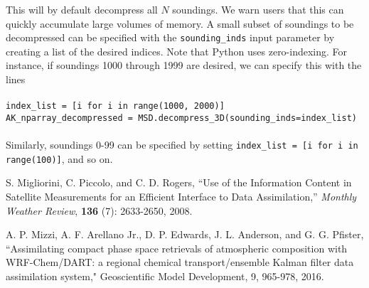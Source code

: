 \documentclass{article}
\begin{document}
\noindent 
This will by default decompress all $N$ soundings. We warn users that this can quickly accumulate large volumes of memory. A small subset of soundings to be decompressed can be specified with the \texttt{sounding\_inds} input parameter by creating a list of the desired indices. Note that Python uses zero-indexing. For instance, if soundings 1000 through 1999 are desired, we can specify this with the lines \\ \\ 
\noindent 
\texttt{index\_list = [i for i in range(1000, 2000)]} \\ 
\texttt{AK\_nparray\_decompressed = MSD.decompress\_3D(sounding\_inds=index\_list)} \\ \\ 
\noindent 
Similarly, soundings 0-99 can be specified by setting \texttt{index\_list = [i for i in range(100)]}, and so on. 








\begin{thebibliography}{100} 

 S. Migliorini, C. Piccolo, and C. D. Rogers, ``Use of the Information Content in Satellite Measurements for an Efficient Interface to Data Assimilation,'' \textit{Monthly Weather Review}, \textbf{136} (7): 2633-2650, 2008. 

 A. P. Mizzi, A. F. Arellano Jr., D. P. Edwards, J. L. Anderson, and G. G. Pfister, ``Assimilating compact phase space retrievals of atmospheric composition with WRF-Chem/DART: a regional chemical transport/ensemble Kalman filter data assimilation system," Geoscientific Model Development, 9, 965-978, 2016. 

\end{thebibliography} 
\end{document}
